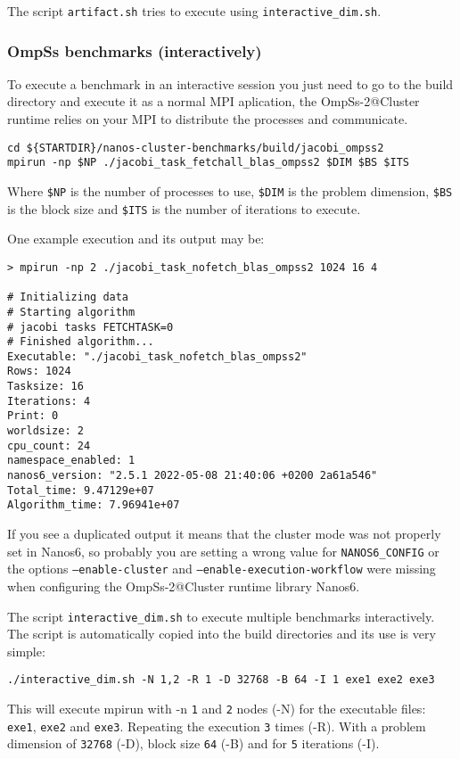 \documentclass{article}
\newcommand{\code}[1]{\texttt{#1}}
\begin{document}
The script \code{artifact.sh} tries to execute using
\code{interactive\_dim.sh}.

\subsubsection{OmpSs benchmarks (interactively)}\label{INTERACTIVE}
To execute a benchmark in an interactive session you just need to go
to the build directory and execute it as a normal MPI aplication, the
OmpSs-2@Cluster runtime relies on your MPI to distribute the processes
and communicate.

\begin{lstlisting}
cd ${STARTDIR}/nanos-cluster-benchmarks/build/jacobi_ompss2
mpirun -np $NP ./jacobi_task_fetchall_blas_ompss2 $DIM $BS $ITS
\end{lstlisting}

Where \code{\$NP} is the number of processes to use, \code{\$DIM} is the
problem dimension, \code{\$BS} is the block size and \code{\$ITS} is the
number of iterations to execute.

One example execution and its output may be:
\begin{lstlisting}
> mpirun -np 2 ./jacobi_task_nofetch_blas_ompss2 1024 16 4

# Initializing data
# Starting algorithm
# jacobi tasks FETCHTASK=0
# Finished algorithm...
Executable: "./jacobi_task_nofetch_blas_ompss2"
Rows: 1024
Tasksize: 16
Iterations: 4
Print: 0
worldsize: 2
cpu_count: 24
namespace_enabled: 1
nanos6_version: "2.5.1 2022-05-08 21:40:06 +0200 2a61a546"
Total_time: 9.47129e+07
Algorithm_time: 7.96941e+07
\end{lstlisting}

If you see a duplicated output it means that the cluster mode was not
properly set in Nanos6, so probably you are setting a wrong value for
\code{NANOS6\_CONFIG} or the options \code{--enable-cluster} and
\code{--enable-execution-workflow} were missing when configuring the
OmpSs-2@Cluster runtime library Nanos6.

The script \code{interactive\_dim.sh} to execute multiple benchmarks
interactively. The script is automatically copied into the build
directories and its use is very simple:

\begin{lstlisting}
./interactive_dim.sh -N 1,2 -R 1 -D 32768 -B 64 -I 1 exe1 exe2 exe3
\end{lstlisting}

This will execute mpirun with -n \code{1} and \code{2} nodes (-N) for
the executable files: \code{exe1}, \code{exe2} and
\code{exe3}. Repeating the execution \code{3} times (-R). With a
problem dimension of \code{32768} (-D), block size \code{64} (-B) and
for \code{5} iterations (-I).
\end{document}
